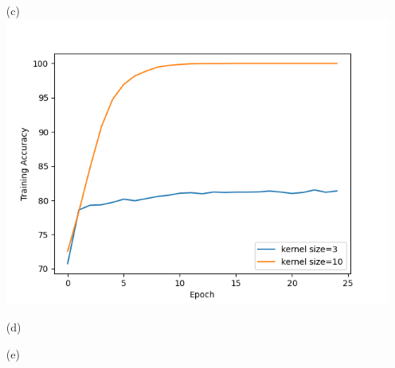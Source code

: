 \documentclass{article}
\theoremstyle{definition}
\theoremstyle{remark}
\begin{document}
\begin{enumerate}[font={\Large\bfseries},left=0pt]
\begin{enumerate}
  \item[(c)] \includegraphics[scale=0.65]{c3vc10.png}\\
  \item[(d)]
  \item[(e)]
\end{enumerate}



 


\end{enumerate}
\end{document}
